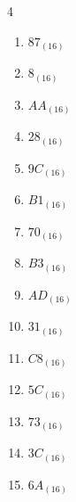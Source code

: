 \begin{multicols}{4}
\begin{enumerate}
        \phantom{$=155$}

  \item $87_{(16)}$

        \phantom{$=135$}

  \item $8_{(16)}$

        \phantom{$=8$}

  \item $AA_{(16)}$

        \phantom{$=170$}

\columnbreak %

\resetques

  \item $28_{(16)}$

        \phantom{$=40$}

  \item $9C_{(16)}$

        \phantom{$=156$}

  \item $B1_{(16)}$

        \phantom{$=177$}

  \item $70_{(16)}$

        \phantom{$=112$}

  \item $B3_{(16)}$

        \phantom{$=179$}

  \item $AD_{(16)}$

        \phantom{$=173$}

  \item $31_{(16)}$

        \phantom{$=49$}

  \item $C8_{(16)}$

        \phantom{$=200$}

  \item $5C_{(16)}$

        \phantom{$=92$}

  \item $73_{(16)}$

        \phantom{$=115$}

  \item $3C_{(16)}$

        \phantom{$=60$}

  \item $6A_{(16)}$


\end{enumerate}
\end{multicols}
